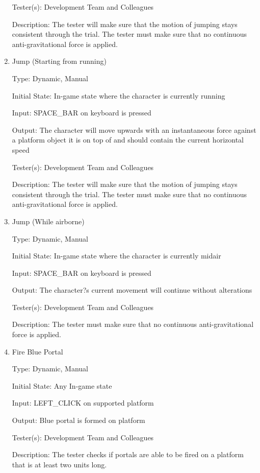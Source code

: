 \documentclass[12pt, titlepage]{article}
\begin{document}
\begin{enumerate}
Tester(s): Development Team and Colleagues

Description: The tester will make sure that the motion of jumping stays consistent through the trial. The tester must make sure that no continuous anti-gravitational force is applied. 

\item{Jump (Starting from running)\\}

Type: Dynamic, Manual

Initial State: In-game state where the character is currently running

Input: SPACE\_BAR on keyboard is pressed

Output: The character will move upwards with an instantaneous force against a platform object it is on top of and should contain the current horizontal speed

Tester(s): Development Team and Colleagues

Description: The tester will make sure that the motion of jumping stays consistent through the trial. The tester must make sure that no continuous anti-gravitational force is applied.

\item{Jump (While airborne)\\}

Type: Dynamic, Manual

Initial State: In-game state where the character is currently midair

Input: SPACE\_BAR on keyboard is pressed

Output: The character?s current movement will continue without alterations

Tester(s): Development Team and Colleagues

Description: The tester must make sure that no continuous anti-gravitational force is applied.

\item{Fire Blue Portal\\}

Type: Dynamic, Manual

Initial State: Any In-game state

Input: LEFT\_CLICK on supported platform

Output: Blue portal is formed on platform

Tester(s): Development Team and Colleagues

Description: The tester checks if portals are able to be fired on a platform that is at least two units long.


\end{enumerate}
\end{document}

